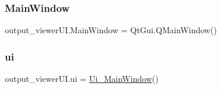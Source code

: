 \subsubsection{\texorpdfstring{Main\+Window}{MainWindow}}
{\footnotesize\ttfamily output\+\_\+viewer\+U\+I.\+Main\+Window = Qt\+Gui.\+Q\+Main\+Window()}

\hypertarget{namespaceoutput__viewer_u_i_a86154c987d338cba4f5269407ad97f69}{}\label{namespaceoutput__viewer_u_i_a86154c987d338cba4f5269407ad97f69} 
\subsubsection{\texorpdfstring{ui}{ui}}
{\footnotesize\ttfamily output\+\_\+viewer\+U\+I.\+ui = \hyperlink{classoutput__viewer_u_i_1_1_ui___main_window}{Ui\+\_\+\+Main\+Window}()}

